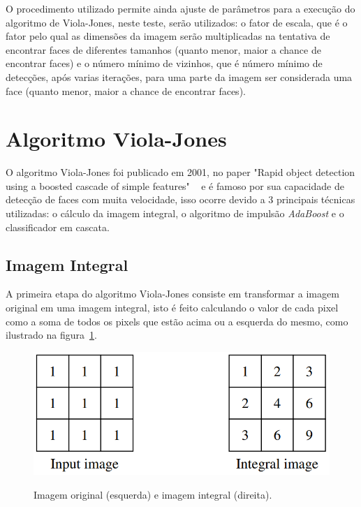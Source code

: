 O procedimento utilizado permite ainda ajuste de parâmetros para a execução do algoritmo de Viola-Jones, neste teste, serão utilizados: o fator de escala, que é o fator pelo qual as dimensões da imagem serão multiplicadas na tentativa de encontrar faces de diferentes tamanhos (quanto menor, maior a chance de encontrar faces) e o número mínimo de vizinhos, que é número mínimo de detecções, após varias iterações, para uma parte da imagem ser considerada uma face (quanto menor, maior a chance de encontrar faces).

\section{Algoritmo Viola-Jones}

O algoritmo Viola-Jones foi publicado em 2001, no paper "Rapid object detection using a boosted cascade of simple features" ~\cite{paper-viola-jones} e é famoso por sua capacidade de detecção de faces com muita velocidade, isso ocorre devido a 3 principais técnicas utilizadas: o cálculo da imagem integral, o algoritmo de impulsão \textit{AdaBoost} e o classificador em cascata.

\subsection{Imagem Integral}

A primeira etapa do algoritmo Viola-Jones consiste em transformar a imagem original em uma imagem integral, isto é feito calculando o valor de cada pixel como a soma de todos os pixels que estão acima ou a esquerda do mesmo, como ilustrado na figura~\ref{fig:integral}.

\begin{figure}[htpb]
    \centering
    \caption{Imagem original (esquerda) e imagem integral (direita).}
    \includegraphics[scale=.4]{figs/imagem-integral.png}
    \label{fig:integral}
 \end{figure}

